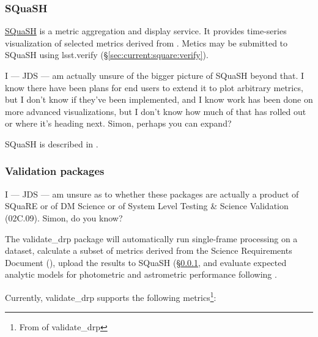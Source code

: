 \documentclass[DM,authoryear,toc,lsstdraft]{lsstdoc}
\begin{document}
\subsubsection{SQuaSH}
\label{sec:current:square:squash}

\href{https://squash.lsst.codes}{SQuaSH} is a metric aggregation and display
service. It provides time-series visualization of selected metrics derived
from . Metics may be submitted to SQuaSH using lsst.verify
(\S\ref{sec:current:square:verify}).

\begin{draftnote}
I --- JDS --- am actually unsure of the bigger picture of SQuaSH beyond that.
I know there have been plans for end users to extend it to plot arbitrary
metrics, but I don't know if they've been implemented, and I know work has
been done on more advanced visualizations, but I don't know how much of that
has rolled out or where it's heading next. Simon, perhaps you can expand?
\end{draftnote}

SQuaSH is described in .

\subsubsection{Validation packages}
\label{sec:current:square:validate}

\begin{draftnote}
I --- JDS --- am unsure as to whether these packages are actually a product of
SQuaRE or of DM Science or of System Level Testing \& Science Validation
(02C.09). Simon, do you know?
\end{draftnote}

The validate\_drp package will automatically run single-frame processing on a
dataset, calculate a subset of metrics derived from the Science Requirements
Document (), upload the results to SQuaSH
(\S\ref{sec:current:square:squash}, and evaluate expected analytic models for
photometric and astrometric performance following \cite{2008arXiv0805.2366I}.

Currently, validate\_drp supports the following metrics\footnote{From
 of validate\_drp }:
\end{document}
